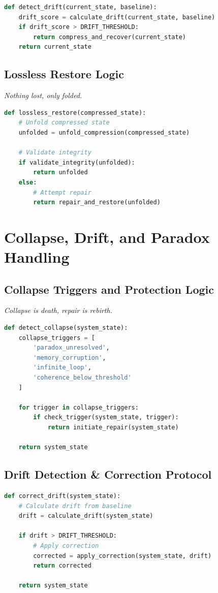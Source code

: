 \documentclass[11pt]{report}
\begin{document}
\begin{lstlisting}[language=python,caption={Drift Detection}]
def detect_drift(current_state, baseline):
    drift_score = calculate_drift(current_state, baseline)
    if drift_score > DRIFT_THRESHOLD:
        return compress_and_recover(current_state)
    return current_state
\end{lstlisting}

\section{Lossless Restore Logic}
\textit{Nothing lost, only folded.}

\begin{lstlisting}[language=python,caption={Lossless Restore}]
def lossless_restore(compressed_state):
    # Unfold compressed state
    unfolded = unfold_compression(compressed_state)
    
    # Validate integrity
    if validate_integrity(unfolded):
        return unfolded
    else:
        # Attempt repair
        return repair_and_restore(unfolded)
\end{lstlisting}

\chapter{Collapse, Drift, and Paradox Handling}

\section{Collapse Triggers and Protection Logic}
\textit{Collapse is death, repair is rebirth.}

\begin{lstlisting}[language=python,caption={Collapse Detection}]
def detect_collapse(system_state):
    collapse_triggers = [
        'paradox_unresolved',
        'memory_corruption',
        'infinite_loop',
        'coherence_below_threshold'
    ]
    
    for trigger in collapse_triggers:
        if check_trigger(system_state, trigger):
            return initiate_repair(system_state)
    
    return system_state
\end{lstlisting}

\section{Drift Detection \& Correction Protocol}
\begin{lstlisting}[language=python,caption={Drift Correction}]
def correct_drift(system_state):
    # Calculate drift from baseline
    drift = calculate_drift(system_state)
    
    if drift > DRIFT_THRESHOLD:
        # Apply correction
        corrected = apply_correction(system_state, drift)
        return corrected
    
    return system_state
\end{lstlisting}
\end{document}
